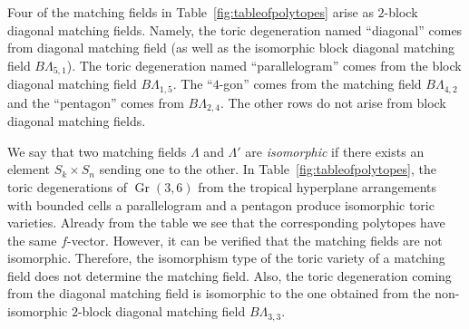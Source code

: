 \documentclass[ALCO,ThmDefs,Unicode,epreuves]{cedram}
\DeclareMathOperator{\Gr}{Gr}
\begin{document}
Four of the matching fields in Table~\ref{fig:tableofpolytopes} arise as $2$-block diagonal matching fields. Namely, the toric degeneration named ``diagonal'' comes from diagonal matching field (as well as the isomorphic block diagonal matching field $B \Lambda_{5,1}$). The toric degeneration named ``parallelogram'' comes from the block diagonal matching field $B\Lambda_{1, 5}$. The ``$4$-gon'' comes from the matching field $B \Lambda_{4,2}$ and the ``pentagon'' comes from $B \Lambda_{2, 4}$. The other rows do not arise from block diagonal matching fields. 

\begin{Remark}We say that two matching fields $\Lambda$ and $\Lambda'$ are \emph{isomorphic} if there exists an element $S_k \times S_n$ sending one to the other. 
In Table~\ref{fig:tableofpolytopes}, the toric degenerations of $\Gr(3, 6)$ from the tropical hyperplane arrangements with bounded cells a parallelogram and a pentagon produce 
isomorphic toric varieties. Already from the table we see that the corresponding polytopes have the same $f$-vector. However, it can be verified that the matching fields are
not isomorphic. Therefore, the isomorphism type of the toric variety of a matching field does not determine the matching field. 
Also, the toric degeneration coming from the diagonal matching field is isomorphic to the one obtained from the non-isomorphic $2$-block diagonal matching field $B \Lambda_{3,3}$. 
\end{Remark}


 


\nocite{*}


\end{document}
